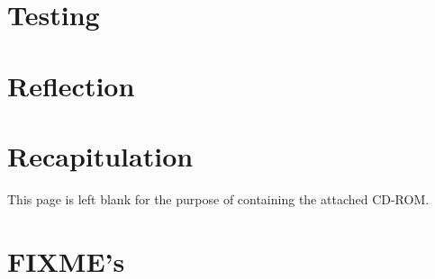 \chapter{Testing}
%
\newpage{}
%
%
%

\chapter{Reflection}
%
\newpage{}
%
%
%

\chapter{Recapitulation}
%
\newpage{}
%
%

\label{theend}
%
%
%
%
\label{bib}
%
%
\appendix
\addappheadtotoc
%
%
%
%
%
%
%
%

\label{pagecount}
%
%
\cleardoublepage
\thispagestyle{empty}
\vspace*{4cm}
\label{cd}
{\centering This page is left blank for the purpose of containing the attached CD-ROM.}

%
%
\newpage
\chapter{FIXME's}
\listoffixmes


